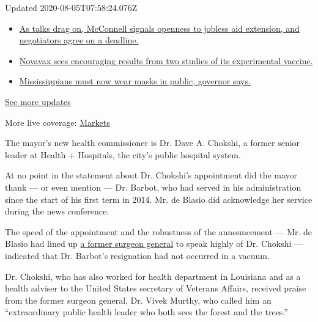 Updated 2020-08-05T07:58:24.076Z

\begin{itemize}
\tightlist
\item
  \href{https://www.nytimes.com/2020/08/04/world/coronavirus-cases.html?action=click\&pgtype=Article\&state=default\&region=MAIN_CONTENT_1\&context=storylines_live_updates\#link-762df92}{As
  talks drag on, McConnell signals openness to jobless aid extension,
  and negotiators agree on a deadline.}
\item
  \href{https://www.nytimes.com/2020/08/04/world/coronavirus-cases.html?action=click\&pgtype=Article\&state=default\&region=MAIN_CONTENT_1\&context=storylines_live_updates\#link-1228a480}{Novavax
  sees encouraging results from two studies of its experimental
  vaccine.}
\item
  \href{https://www.nytimes.com/2020/08/04/world/coronavirus-cases.html?action=click\&pgtype=Article\&state=default\&region=MAIN_CONTENT_1\&context=storylines_live_updates\#link-794484ed}{Mississippians
  must now wear masks in public, governor says.}
\end{itemize}

\href{https://www.nytimes.com/2020/08/04/world/coronavirus-cases.html?action=click\&pgtype=Article\&state=default\&region=MAIN_CONTENT_1\&context=storylines_live_updates}{See
more updates}

More live coverage:
\href{https://www.nytimes.com/live/2020/08/04/business/stock-market-today-coronavirus?action=click\&pgtype=Article\&state=default\&region=MAIN_CONTENT_1\&context=storylines_live_updates}{Markets}

The mayor's new health commissioner is Dr. Dave A. Chokshi, a former
senior leader at Health + Hospitals, the city's public hospital system.

At no point in the statement about Dr. Chokshi's appointment did the
mayor thank --- or even mention --- Dr. Barbot, who had served in his
administration since the start of his first term in 2014. Mr. de Blasio
did acknowledge her service during the news conference.

The speed of the appointment and the robustness of the announcement ---
Mr. de Blasio had lined up
\href{https://wayback.archive-it.org/4765/20170106172109/https:/www.hhs.gov/about/leadership/vadm-vivek-murthy/index.html}{a
former surgeon general} to speak highly of Dr. Chokshi --- indicated
that Dr. Barbot's resignation had not occurred in a vacuum.

Dr. Chokshi, who has also worked for health department in Louisiana and
as a health adviser to the United States secretary of Veterans Affairs,
received praise from the former surgeon general, Dr. Vivek Murthy, who
called him an ``extraordinary public health leader who both sees the
forest and the trees.''

